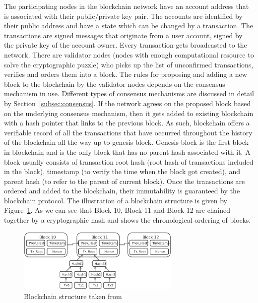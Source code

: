 The participating nodes in the blockchain network have an account address that
is associated with their public/private key pair. The accounts are identified
by their public address and have a state which can be changed by a transaction.
The transactions are signed messages that originate from a user account, signed
by the private key of the account owner. Every transaction gets broadcasted to
the network. There are validator nodes (nodes with enough computational
resource to solve the cryptographic puzzle) who picks up the list of
unconfirmed transactions, verifies and orders them into a block. The rules for
proposing and adding a new block to the blockchain by the validator nodes
depends on the consensus mechanism in use. Different types of consensus
mechanisms are discussed in detail by Section~\ref{subsec:consensus}. If the
network agrees on the proposed block based on the underlying consensus
mechanism, then it gets added to existing blockchain with a hash pointer that
links to the previous block. As such, blockchain offers a verifiable record of
all the transactions that have occurred throughout the history of the
blockchain all the way up to genesis block. Genesis block is the first block in
blockchain and is the only block that has no parent hash associated with it. A
block usually consists of transaction root hash (root hash of transactions
included in the block), timestamp (to verify the time when the block got
created), and parent hash (to refer to the parent of current block). Once the
transactions are ordered and added to the blockchain, their immutability is
guaranteed by the blockchain protocol. The illustration of a blockchain
structure is given by Figure~\ref{BlockchainStructure}. As we can see that
Block 10, Block 11 and Block 12 are chained together by a cryptographic hash
and shows the chronological ordering of blocks.
\begin{figure}
	\centering
	\includegraphics[width=0.7\textwidth]{Images/BlockchainStructure.eps}
	\caption{Blockchain structure taken from~\cite{Bitcoin_Satoshi} }
	\label{BlockchainStructure}
\end{figure}
